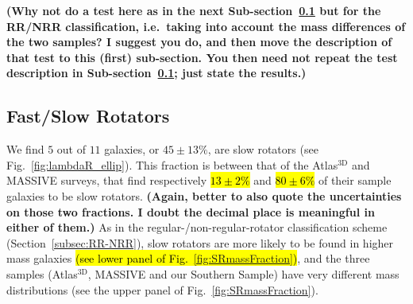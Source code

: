 \documentclass[a4paper,fleqn,usenatbib]{mnras}
\DeclareRobustCommand{\added}[1]{{\sethlcolor{green}\hl{#1}}}
\begin{document}
{\bf (Why not do a test here as in the next
  Sub-section~\ref{subsec:FR-SR} but for the RR/NRR classification,
  i.e.\ taking into account the mass differences of the two samples? I
  suggest you do, and then move the description of that test to this
  (first) sub-section. You then need not repeat the test description
  in Sub-section~\ref{subsec:FR-SR}; just state the results.)}

\subsection{Fast/Slow Rotators}
\label{subsec:FR-SR}

We find $5$ out of $11$ galaxies, or $45\pm13\%$, are slow rotators
(see Fig.~\ref{fig:lambdaR_ellip}). This fraction is between that of
the Atlas$^\text{3D}$ and MASSIVE surveys, that find respectively
\added{$13\pm2\%$} and \added{$80\pm6\%$} of their sample galaxies to be slow
rotators. {\bf (Again, better to also quote the uncertainties on those
  two fractions. I doubt the decimal place is meaningful in either of
  them.)} As in the regular-/non-regular-rotator classification scheme
(Section~\ref{subsec:RR-NRR}), slow rotators are more likely to be
found in higher mass galaxies \added{(see lower panel of Fig.~\ref{fig:SRmassFraction})}, and the three samples
(Atlas$^\text{3D}$, MASSIVE and our Southern Sample) have very
different mass distributions (see the upper panel of
Fig.~\ref{fig:SRmassFraction}).
\end{document}
